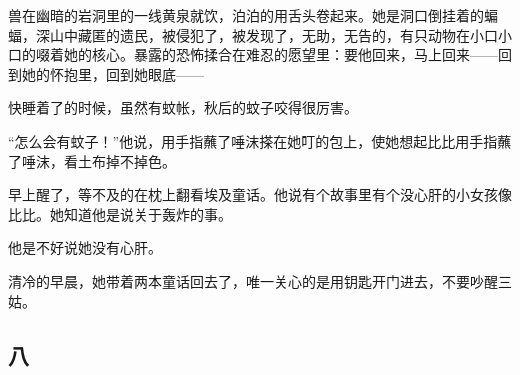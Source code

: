 \par 兽在幽暗的岩洞里的一线黄泉就饮，泊泊的用舌头卷起来。她是洞口倒挂着的蝙蝠，深山中藏匿的遗民，被侵犯了，被发现了，无助，无告的，有只动物在小口小口的啜着她的核心。暴露的恐怖揉合在难忍的愿望里：要他回来，马上回来——回到她的怀抱里，回到她眼底——
\par 快睡着了的时候，虽然有蚊帐，秋后的蚊子咬得很厉害。
\par “怎么会有蚊子！”他说，用手指蘸了唾沫搽在她叮的包上，使她想起比比用手指蘸了唾沫，看土布掉不掉色。
\par 早上醒了，等不及的在枕上翻看埃及童话。他说有个故事里有个没心肝的小女孩像比比。她知道他是说关于轰炸的事。
\par 他是不好说她没有心肝。
\par 清冷的早晨，她带着两本童话回去了，唯一关心的是用钥匙开门进去，不要吵醒三姑。

\subsection{八}

